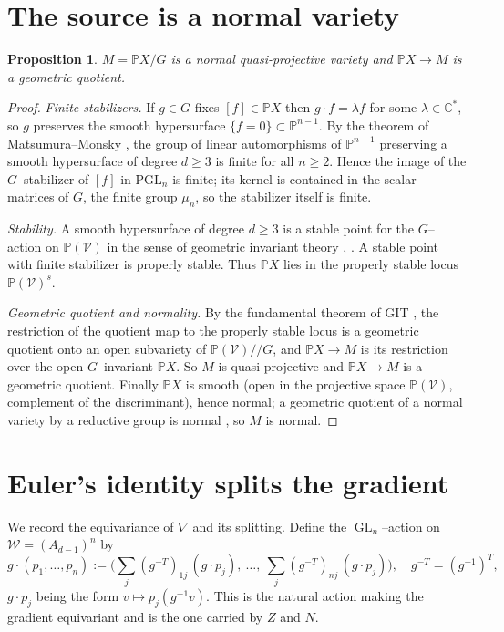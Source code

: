 \documentclass{amsart}
\newtheorem{proposition}{Proposition}
\theoremstyle{definition}
\DeclareMathOperator{\GL}{GL}
\newcommand{\PP}{\mathbb{P}}
\newcommand{\CC}{\mathbb{C}}
\newcommand{\nab}{\nabla}
\begin{document}
\section{The source is a normal variety}\label{sec:source}

\begin{proposition}\label{prop:sourcenormal}
$M=\PP X/G$ is a normal quasi-projective variety and $\PP X\to M$ is a geometric quotient.
\end{proposition}

\begin{proof}
\emph{Finite stabilizers.} If $g\in G$ fixes $[f]\in \PP X$ then $g\cdot f=\lambda f$ for
some $\lambda\in\CC^{*}$, so $g$ preserves the smooth hypersurface $\{f=0\}\subset\PP^{n-1}$.
By the theorem of Matsumura--Monsky \cite{MM}, the group of linear automorphisms of
$\PP^{n-1}$ preserving a smooth hypersurface of degree $d\ge 3$ is finite for all $n\ge 2$.
Hence the image of the $G$--stabilizer of $[f]$ in $\mathrm{PGL}_n$ is finite; its kernel
is contained in the scalar matrices of $G$, the finite group $\mu_n$, so the stabilizer
itself is finite.

\emph{Stability.} A smooth hypersurface of degree $d\ge 3$ is a stable point for the
$G$--action on $\PP(\mathcal V)$ in the sense of geometric invariant theory
\cite[\S 4.2]{Mumford}, \cite[Ch.~1, \S 4]{MFK}. A stable point with finite stabilizer is
properly stable. Thus $\PP X$ lies in the properly stable locus $\PP(\mathcal V)^{s}$.

\emph{Geometric quotient and normality.} By the fundamental theorem of GIT
\cite[Ch.~1, Thm.~1.10 and Converse~1.13]{MFK}, the restriction of the quotient map to the
properly stable locus is a geometric quotient onto an open subvariety of
$\PP(\mathcal V)/\!/G$, and $\PP X\to M$ is its restriction over the open $G$--invariant
$\PP X$. So $M$ is quasi-projective and $\PP X\to M$ is a geometric quotient. Finally $\PP X$
is smooth (open in the projective space $\PP(\mathcal V)$, complement of the discriminant),
hence normal; a geometric quotient of a normal variety by a reductive group is normal
\cite[Ch.~1, \S 2]{MFK}, so $M$ is normal.
\end{proof}

\section{Euler's identity splits the gradient}\label{sec:euler}

We record the equivariance of $\nab$ and its splitting. Define the $\GL_n$--action on
$\mathcal W=(A_{d-1})^n$ by
\begin{equation}\label{eq:Zaction}
g\cdot (p_1,\dots,p_n)
:= \Big(\textstyle\sum_{j}(g^{-T})_{1j}\,(g\cdot p_j),\ \dots,\ \sum_{j}(g^{-T})_{nj}\,(g\cdot p_j)\Big),
\quad g^{-T}=(g^{-1})^{T},
\end{equation}
$g\cdot p_j$ being the form $v\mapsto p_j(g^{-1}v)$. This is the natural action making the
gradient equivariant and is the one carried by $Z$ and $N$.
\end{document}
